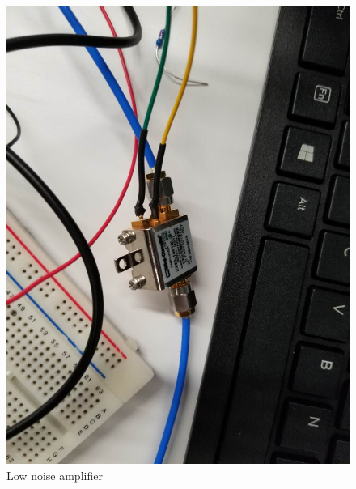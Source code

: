 \documentclass[12pt,a4paper]{report}
\begin{document}
\begin{figure}
    \centerline{\includegraphics[scale=0.2]{LNA.PNG}}
    \caption{Low noise amplifier}
    \label{fig:LNA}
\end{figure}
\end{document}
